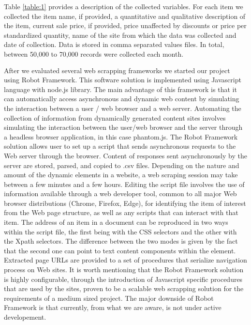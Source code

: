 \documentclass[]{article}
\begin{document}
Table \ref{table:1} provides a description of the collected variables. For each item we collected the item name, if provided, 
a quantitative and qualitative description of the item, current sale price, if provided, price unaffected by discounts or 
price per standardized quantity, name of the site from which the data was collected and date of collection. Data is stored 
in comma separated values files. In total, between 50,000 to 70,000 records were collected each month.



After we evaluated several web scrapping frameworks we started our project using Robot Framework. This software solution is implemented using Javascript language with node.js library.
The main advantage of this framework is that it can automatically access asynchronous and dynamic web content by simulating the interaction between a user / web browser and a web server. Automating the collection of information from dynamically generated content sites involves simulating the interaction between the user/web browser and the server through a headless browser application, in this case phantom.js. The Robot Framework solution allows user to set up a script that sends asynchronous requests to the Web server through the browser. Content of responses sent asynchronously by the server are stored, parsed, and copied to .csv files. Depending on the nature and amount of the dynamic elements in a website, a web scraping session may take between a few minutes and a few hours.
Editing the script file involves the use of information available through a web developer tool, common to all major Web browser distributions (Chrome, Firefox, Edge), for identifying the item of interest from the Web page structure, as well as any scripts that can interact with that item. The address of an item in a document can be reproduced in two ways within the script file, the first being with the CSS selectors and the other with the Xpath selectors. The difference between the two modes is given by the fact that the second one can point to text content components within the element. Extracted page URLs are provided to a set of procedures that serialize navigation process on Web sites. It is worth mentioning that the Robot Framework solution is highly configurable, through the introduction of Javascript specific procedures that are used by the sites, proven to be a scalable web scrapping solution for the requirements of a medium sized project. The major downside of Robot Framework is that currently, from what we are aware, is not under active developement.
\end{document}
